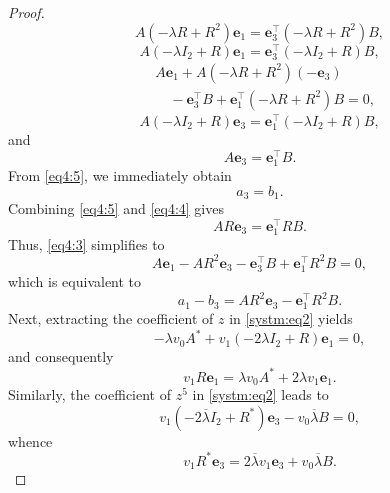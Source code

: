 \documentclass[12pt, reqno]{amsart}
\theoremstyle{definition}
\theoremstyle{remark}
\numberwithin{equation}{section}
\begin{document}
\begin{proof}
	\begin{equation}\label{eq4:1}
		A(-\lambda R + R^2) \mathbf{e}_1 = \mathbf{e}_3^\top (-\lambda R + R^2) B, 
	\end{equation} 
	\begin{equation}\label{eq4:2}
		A(-\lambda I_2 + R) \mathbf{e}_1 = \mathbf{e}_3^\top (-\lambda I_2 + R) B, 
	\end{equation} 
	\begin{align}
		& A \mathbf{e}_1 + A(-\lambda R + R^2) (-\mathbf{e}_3) \nonumber\\ 
		& \quad - \mathbf{e}_3^\top B + \mathbf{e}_1^\top (-\lambda R + R^2) B = 0, \label{eq4:3}
	\end{align}
	\begin{equation}\label{eq4:4} 
		A(-\lambda I_2 + R) \mathbf{e}_3 = \mathbf{e}_1^\top (-\lambda I_2 + R) B, 
	\end{equation}
	and
	\begin{equation}\label{eq4:5}  
		A \mathbf{e}_3 = \mathbf{e}_1^\top B. 
	\end{equation} 
	From \eqref{eq4:5}, we immediately obtain
	\begin{equation}\label{eq1}
		a_3 = b_1.	
	\end{equation} 
	Combining \eqref{eq4:5} and \eqref{eq4:4} gives
	\begin{equation}\label{eq4:7}
		A R \mathbf{e}_3 = \mathbf{e}_1^\top R B. 
	\end{equation}
	Thus, \eqref{eq4:3} simplifies to
	\begin{equation}
		A \mathbf{e}_1 - A R^2 \mathbf{e}_3 - \mathbf{e}_3^\top B + \mathbf{e}_1^\top R^2 B = 0, \label{eq4:6}
	\end{equation}  
	which is equivalent to
	\begin{equation}\label{eq4:6bis}
		a_1 - b_3 = A R^2 \mathbf{e}_3 - \mathbf{e}_1^\top R^2 B.
	\end{equation}
	Next, extracting the coefficient of $z$ in \eqref{systm:eq2} yields
	\[
	-\lambda v_0 A^* + v_1 (-2\lambda I_2 + R) \mathbf{e}_1 = 0,
	\]
	and consequently
	\begin{equation}\label{eq2:z}
		v_1 R \mathbf{e}_1 = \lambda v_0 A^* + 2\lambda v_1 \mathbf{e}_1. 
	\end{equation}
	Similarly, the coefficient of $z^5$ in \eqref{systm:eq2} leads to
	\[
	v_1 (-2\overline{\lambda} I_2 + R^*) \mathbf{e}_3-v_0 \overline{\lambda} B = 0,
	\]
	whence
	\begin{equation}\label{eq2:z5}
		v_1 R^* \mathbf{e}_3 = 2\overline{\lambda} v_1 \mathbf{e}_3 + v_0 \overline{\lambda} B. 

\end{equation}
\end{proof}
\end{document}
